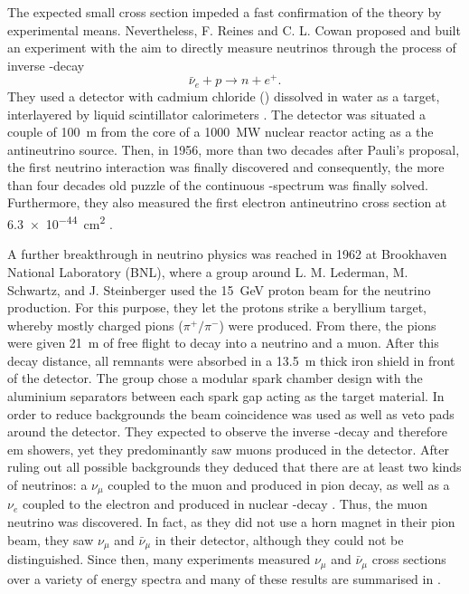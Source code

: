 The expected small cross section impeded a fast confirmation of the theory by experimental means. Nevertheless, F. Reines and C. L. Cowan proposed and built an experiment with the aim to directly measure neutrinos through the process of inverse \textbeta-decay
\begin{equation} \label{eq:InverseBetaDecay}
 \bar{\nu}_e + p \rightarrow n + e^{+}.
\end{equation}
They used a detector with cadmium chloride () dissolved in water as a target, interlayered by liquid scintillator calorimeters \cite{NuDiscoveryDetector1,NuDiscoveryDetector2}. The detector was situated a couple of \SI{100}{\metre} from the core of a \SI{1000}{\mega\watt} nuclear reactor acting as a the antineutrino source. Then, in 1956, more than two decades after Pauli's proposal, the first neutrino interaction was finally discovered and consequently, the more than four decades old puzzle of the continuous \textbeta-spectrum was finally solved. Furthermore, they also measured the first electron antineutrino cross section at \SI{6.3e-44}{\centi\metre\squared} \cite{NuDiscovery1,NuDiscovery2}.

A further breakthrough in neutrino physics was reached in 1962 at Brookhaven National Laboratory (BNL), where a group around L. M. Lederman, M. Schwartz, and J. Steinberger used the \SI{15}{\giga\electronvolt} proton beam for the neutrino production. For this purpose, they let the protons strike a beryllium target, whereby mostly charged pions ($\pi^+ / \pi^-$) were produced. From there, the pions were given \SI{21}{\metre} of free flight to decay into a neutrino and a muon. After this decay distance, all remnants were absorbed in a \SI{13.5}{\metre} thick iron shield in front of the detector. The group chose a modular spark chamber design with the aluminium separators between each spark gap acting as the target material. In order to reduce backgrounds the beam coincidence was used as well as veto pads around the detector. They expected to observe the inverse \textbeta-decay and therefore \gls{em} showers, yet they predominantly saw muons produced in the detector. After ruling out all possible backgrounds they deduced that there are at least two kinds of neutrinos: a $\nu_{\mu}$ coupled to the muon and produced in pion decay, as well as a $\nu_e$ coupled to the electron and produced in nuclear \textbeta-decay \cite{NuMuDiscovery}. Thus, the muon neutrino was discovered. In fact, as they did not use a horn magnet in their pion beam, they saw $\nu_{\mu}$ and $\bar\nu_{\mu}$ in their detector, although they could not be distinguished. Since then, many experiments measured $\nu_{\mu}$ and $\bar\nu_{\mu}$ cross sections over a variety of energy spectra and many of these results are summarised in \cite{PDG2018}.

